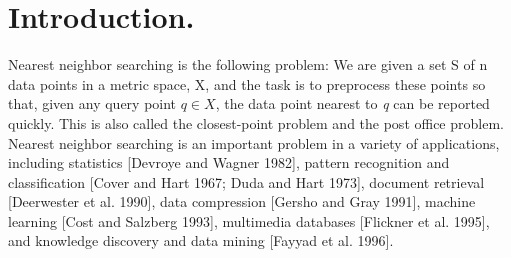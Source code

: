 \documentclass[ijoc,nonblindrev]{informs3} %
\begin{document}
%

\section{Introduction.}
Nearest neighbor searching is the following problem: 
We are given a set S of n data points in a metric space, X,
and the task is to preprocess these points so that,
given any query point $q \in X$,
the data point nearest to \textit{q} can be reported quickly.
This is also called the closest-point problem and the post office problem.
Nearest neighbor searching is an important problem in a variety of applications, including 
statistics [Devroye and Wagner 1982],
pattern recognition and classification [Cover and Hart 1967; Duda and Hart 1973],
document retrieval [Deerwester et al. 1990],
data compression [Gersho and Gray 1991],
machine learning [Cost and Salzberg 1993],
multimedia databases [Flickner et al. 1995],
and knowledge discovery and data mining [Fayyad et al. 1996].
\end{document}
